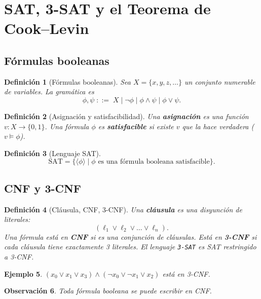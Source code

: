 \documentclass[11pt,a4paper]{article}
\theoremstyle{definicion}
\newtheorem{definicion}{Definici\'on}[section]
\newtheorem{ejemplo}[definicion]{Ejemplo}
\newtheorem{observacion}[definicion]{Observaci\'on}
\newcommand{\enc}[1]{\langle #1 \rangle}
\begin{document}
\section{SAT, 3-SAT y el Teorema de Cook--Levin}

\subsection{F\'ormulas booleanas}

\begin{definicion}[F\'ormulas booleanas]
Sea $X = \{x, y, z, \dots\}$ un conjunto numerable de variables. La gram\'atica es
\[
\phi, \psi \;::=\; X \mid \neg\phi \mid \phi \land \psi \mid \phi \lor \psi.
\]
\end{definicion}

\begin{definicion}[Asignaci\'on y satisfacibilidad]
Una \textbf{asignaci\'on} es una funci\'on $v : X \to \{0, 1\}$. Una f\'ormula $\phi$ es \textbf{satisfacible} si existe $v$ que la hace verdadera ($v \models \phi$).
\end{definicion}

\begin{definicion}[Lenguaje SAT]
\[
\mathrm{SAT} = \{ \enc{\phi} \mid \phi \text{ es una f\'ormula booleana satisfacible}\}.
\]
\end{definicion}

\subsection{CNF y 3-CNF}

\begin{definicion}[Cl\'ausula, CNF, 3-CNF]
Una \textbf{cl\'ausula} es una disyunci\'on de literales:
\[
(\ell_1 \lor \ell_2 \lor \dots \lor \ell_n).
\]
Una f\'ormula est\'a en \textbf{CNF} si es una conjunci\'on de cl\'ausulas. Est\'a en \textbf{3-CNF} si cada cl\'ausula tiene exactamente 3 literales. El lenguaje \texttt{3-SAT} es SAT restringido a 3-CNF.
\end{definicion}

\begin{ejemplo}
$(x_0 \lor x_1 \lor x_3) \land (\neg x_0 \lor \neg x_1 \lor x_2)$ est\'a en 3-CNF.
\end{ejemplo}

\begin{observacion}
Toda f\'ormula booleana se puede escribir en CNF.
\end{observacion}
\end{document}
